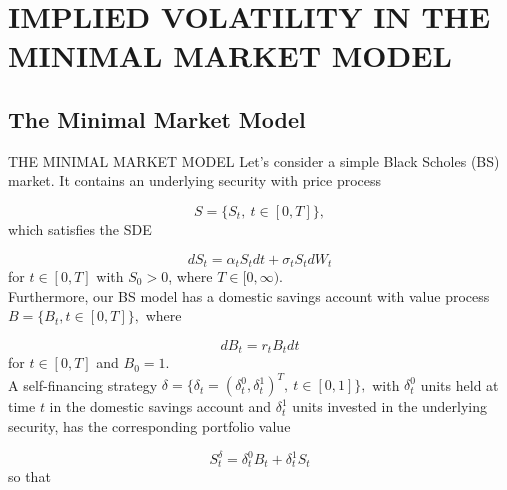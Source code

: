 \documentclass[unknownkeysallowed, compress]{beamer}
\theoremstyle{plain}
\begin{document}

\section{IMPLIED VOLATILITY IN THE MINIMAL MARKET MODEL}
\subsection{The Minimal Market Model}
\begin{frame}[allowframebreaks]{THE MINIMAL MARKET MODEL}
    Let's consider a simple Black Scholes (BS) market. It contains an underlying security with price process

$$
S = \{S_t,~t\in[0,T]\},
$$
which satisfies the SDE

\begin{equation}\label{1}
dS_t = \alpha_t S_tdt+\sigma_tS_tdW_t
\end{equation}
for $t\in[0,T]$ with $S_0>0$, where $T\in[0,\infty)$.\\
Furthermore, our BS model has a domestic savings account with value process $B = \{B_t,t\in[0,T]\},$ where 

\begin{equation}\label{2}
dB_t = r_tB_tdt
\end{equation}
for $t\in[0,T]$ and $B_0  = 1$.\\
A self-financing strategy $\delta = \{\delta_t = (\delta_t^0,\delta_t^1)^T,~t\in[0,1]\},$ with $\delta_t^0$ units held at time $t$ in the domestic savings account and $\delta_t^1$ units invested in the underlying security, has the corresponding portfolio value

\begin{equation}\label{9.1.3}
S_t^\delta = \delta_t^0B_t+\delta_t^1S_t
\end{equation}
so that 


\end{frame}
\end{document}
